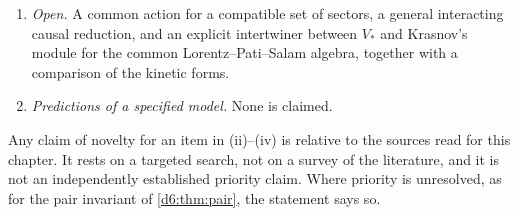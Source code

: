 \begin{enumerate}[label=(\roman*),leftmargin=2.2em]
\begin{itemize}
  \end{itemize}
The vacuum selections of \cref{ch:ch07_vacuum,ch:ch08_photon} depend on the coefficients of the adopted potentials and are conditional
results. In \cref{ch:ch07_vacuum} global minimality on the full kernel space below $x_*$ is a numerically supported conjecture; in
\cref{ch:ch08_photon} the global result on $F_3$ for the explicitly adopted potential is proved (\cref{p3:thm:selection}), while the origin and
robustness of that potential remain open; neither is a complete quantum effective potential.
\item \emph{Open.} A common action for a compatible set of sectors, a general interacting causal reduction, and an explicit intertwiner between
$V_*$ and Krasnov's module for the common Lorentz--Pati--Salam algebra, together with a comparison of the kinetic forms.
\item \emph{Predictions of a specified model.} None is claimed.
\end{enumerate}
Any claim of novelty for an item in (ii)--(iv) is relative to the sources read for this chapter. It rests on a targeted search, not on a
survey of the literature, and it is not an independently established priority claim. Where priority is unresolved, as for the pair invariant of
\cref{d6:thm:pair}, the statement says so.
